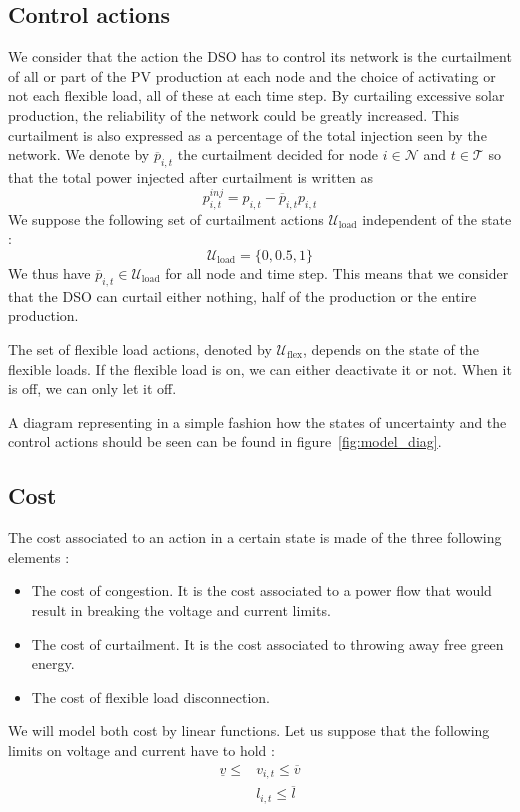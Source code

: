 \subsection{Control actions}

We consider that the action the DSO has to control its network is the curtailment of all or part of the PV production at each node and the choice of activating or not each flexible load, all of these at each time step.
By curtailing excessive solar production, the reliability of the network could be greatly increased.
This curtailment is also expressed as a percentage of the total injection seen by the network.
We denote by $\overline{p}_{i,t}$ the curtailment decided for node $i \in \mathcal{N}$ and $t \in \mathcal{T}$ so that the total power injected after curtailment is written as
\[
  p^{inj}_{i,t} = p_{i,t} - \overline{p}_{i,t}p_{i,t}
\]
We suppose the following set of curtailment actions $\mathcal{U}_{\text{load}}$ independent of the state :
\[
  \mathcal{U}_{\text{load}} = \{0, 0.5, 1\}
\]
We thus have $\overline{p}_{i,t} \in \mathcal{U}_{\text{load}}$ for all node and time step.
This means that we consider that the DSO can curtail either nothing, half of the production or the entire production.

The set of flexible load actions, denoted by $\mathcal{U}_{\text{flex}}$, depends on the state of the flexible loads.
If the flexible load is on, we can either deactivate it or not.
When it is off, we can only let it off.

A diagram representing in a simple fashion how the states of uncertainty
and the control actions should be seen can be found in figure~\ref{fig:model_diag}.

\subsection{Cost}
The cost associated to an action in a certain state is made of the three following elements :
\begin{itemize}
  \item The cost of congestion. It is the cost associated to a power flow that would result in breaking the voltage and current limits.
  \item The cost of curtailment. It is the cost associated to throwing away free green energy.
  \item The cost of flexible load disconnection.
\end{itemize}

We will model both cost by linear functions.
Let us suppose that the following limits on voltage and current have to hold :
\begin{align*}
  \underline{v} \le &v_{i,t} \le \overline{v}\\
  &l_{i,t} \le \overline{l}
\end{align*}

